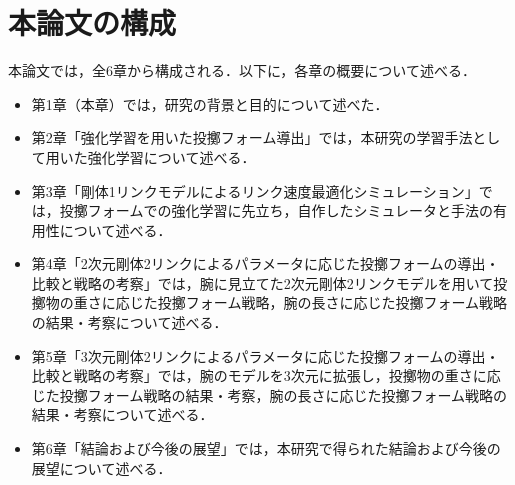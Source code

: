         \section{本論文の構成}
        本論文では，全6章から構成される．以下に，各章の概要について述べる．
        \begin{itemize}
          \item 第1章（本章）では，研究の背景と目的について述べた．
          \item 第2章「強化学習を用いた投擲フォーム導出」では，本研究の学習手法として用いた強化学習について述べる．
          \item 第3章「剛体1リンクモデルによるリンク速度最適化シミュレーション」では，投擲フォームでの強化学習に先立ち，自作したシミュレータと手法の有用性について述べる．
          \item 第4章「2次元剛体2リンクによるパラメータに応じた投擲フォームの導出・比較と戦略の考察」では，腕に見立てた2次元剛体2リンクモデルを用いて投擲物の重さに応じた投擲フォーム戦略，腕の長さに応じた投擲フォーム戦略の結果・考察について述べる．
          \item 第5章「3次元剛体2リンクによるパラメータに応じた投擲フォームの導出・比較と戦略の考察」では，腕のモデルを3次元に拡張し，投擲物の重さに応じた投擲フォーム戦略の結果・考察，腕の長さに応じた投擲フォーム戦略の結果・考察について述べる．
          \item 第6章「結論および今後の展望」では，本研究で得られた結論および今後の展望について述べる．
        \end{itemize}
